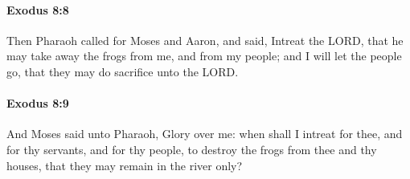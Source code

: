 		\paragraph{Exodus 8:8} %
			\label{EXODUS-8-8}

			Then Pharaoh called for Moses and Aaron, and said, Intreat the LORD, that he may take away the frogs from me, and from my people; and I will let the people go, that they may do sacrifice unto the LORD.


		\paragraph{Exodus 8:9} %
			\label{EXODUS-8-9}

			And Moses said unto Pharaoh, Glory over me: when shall I intreat for thee, and for thy servants, and for thy people, to destroy the frogs from thee and thy houses, that they may remain in the river only?

